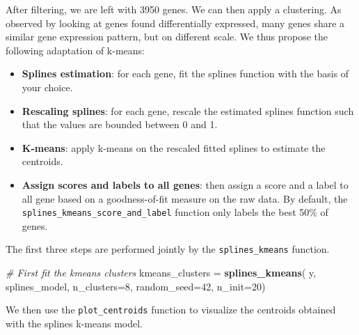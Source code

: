 \documentclass[9pt,a4paper,]{extarticle}
\newenvironment{Shaded}{\begin{snugshade}}{\end{snugshade}}
\newcommand{\CommentTok}[1]{\textcolor[rgb]{0.56,0.35,0.01}{\textit{#1}}}
\newcommand{\DataTypeTok}[1]{\textcolor[rgb]{0.13,0.29,0.53}{#1}}
\newcommand{\DecValTok}[1]{\textcolor[rgb]{0.00,0.00,0.81}{#1}}
\newcommand{\KeywordTok}[1]{\textcolor[rgb]{0.13,0.29,0.53}{\textbf{#1}}}
\newcommand{\NormalTok}[1]{#1}
\newcommand{\OperatorTok}[1]{\textcolor[rgb]{0.81,0.36,0.00}{\textbf{#1}}}
\newcommand{\OtherTok}[1]{\textcolor[rgb]{0.56,0.35,0.01}{#1}}
\newcommand{\StringTok}[1]{\textcolor[rgb]{0.31,0.60,0.02}{#1}}
\begin{document}
After filtering, we are left with 3950 genes. We can then apply a
clustering. As observed by looking at genes found differentially expressed,
many genes share a similar gene expression pattern, but on different scale.
We thus propose the following adaptation of k-means:

\begin{itemize}
\tightlist
\item
  \textbf{Splines estimation}: for each gene, fit the splines function with the basis
  of your choice.
\item
  \textbf{Rescaling splines}: for each gene, rescale the estimated splines function
  such that the values are bounded between 0 and 1.
\item
  \textbf{K-means}: apply k-means on the rescaled fitted splines to estimate the
  centroids.
\item
  \textbf{Assign scores and labels to all genes}: then assign a score and a label
  to all gene based on a goodness-of-fit measure on the raw data. By default,
  the \texttt{splines\_kmeans\_score\_and\_label} function only labels the best 50\% of
  genes.
\end{itemize}

The first three steps are performed jointly by the \texttt{splines\_kmeans} function.

\begin{Shaded}
\begin{Highlighting}[]
\CommentTok{# First fit the kmeans clusters}
\NormalTok{kmeans_clusters =}\StringTok{ }\KeywordTok{splines_kmeans}\NormalTok{(}
\NormalTok{    y, splines_model, }\DataTypeTok{n_clusters=}\DecValTok{8}\NormalTok{,}
    \DataTypeTok{random_seed=}\DecValTok{42}\NormalTok{,}
    \DataTypeTok{n_init=}\DecValTok{20}\NormalTok{)}
\end{Highlighting}
\end{Shaded}

We then use the \texttt{plot\_centroids} function to visualize the centroids obtained
with the splines k-means model.

\begin{Shaded}
\end{Shaded}
\end{document}
